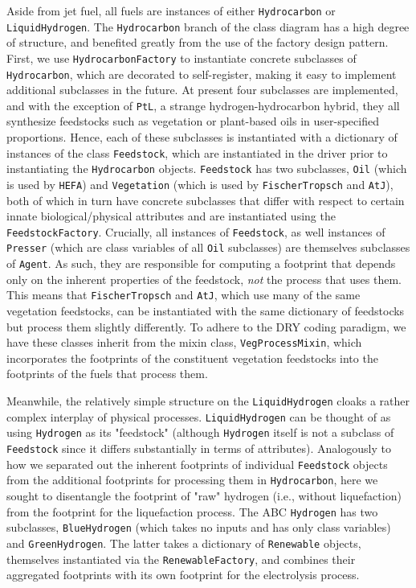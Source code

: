 \documentclass{article}
\begin{document}
Aside from jet fuel, all fuels are instances of either \texttt{Hydrocarbon} or \texttt{LiquidHydrogen}. The \texttt{Hydrocarbon} branch of the class diagram has a high degree of structure, and benefited greatly from the use of the factory design pattern. First, we use \texttt{HydrocarbonFactory} to instantiate concrete subclasses of \texttt{Hydrocarbon}, which are decorated to self-register, making it easy to implement additional subclasses in the future. At present four subclasses are implemented, and with the exception of \texttt{PtL}, a strange hydrogen-hydrocarbon hybrid, they all synthesize feedstocks such as vegetation or plant-based oils in user-specified proportions. Hence, each of these subclasses is instantiated with a dictionary of instances of the class \texttt{Feedstock}, which are instantiated in the driver prior to instantiating the \texttt{Hydrocarbon} objects.  \texttt{Feedstock} has two subclasses, \texttt{Oil} (which is used by \texttt{HEFA}) and \texttt{Vegetation} (which is used by \texttt{FischerTropsch} and \texttt{AtJ}), both of which in turn have concrete subclasses that differ with respect to certain innate biological/physical attributes and are instantiated using the \texttt{FeedstockFactory}. Crucially, all instances of \texttt{Feedstock}, as well instances of \texttt{Presser} (which are class variables of all \texttt{Oil} subclasses) are themselves subclasses of \texttt{Agent}. As such, they are responsible for computing a footprint that depends only on the inherent properties of the feedstock, \textit{not} the process that uses them. This means that \texttt{FischerTropsch} and \texttt{AtJ}, which use many of the same vegetation feedstocks, can be instantiated with the same dictionary of feedstocks but process them slightly differently. To adhere to the DRY coding paradigm, we have these classes inherit from the mixin class, \texttt{VegProcessMixin}, which incorporates the footprints of the constituent vegetation feedstocks into the footprints of the fuels that process them.

Meanwhile, the relatively simple structure on the \texttt{LiquidHydrogen} cloaks a rather complex interplay of physical processes. \texttt{LiquidHydrogen} can be thought of as using \texttt{Hydrogen} as its "feedstock" (although \texttt{Hydrogen} itself is not a subclass of \texttt{Feedstock} since it differs substantially in terms of attributes). Analogously to how we separated out the inherent footprints of individual \texttt{Feedstock} objects from the additional footprints for processing them in \texttt{Hydrocarbon}, here we sought to disentangle the footprint of "raw" hydrogen (i.e., without liquefaction) from the footprint for the liquefaction process. The ABC \texttt{Hydrogen} has two subclasses, \texttt{BlueHydrogen} (which takes no inputs and has only class variables) and \texttt{GreenHydrogen}. The latter takes a dictionary of \texttt{Renewable} objects, themselves instantiated via the \texttt{RenewableFactory}, and combines their aggregated footprints with its own footprint for the electrolysis process.
\end{document}
